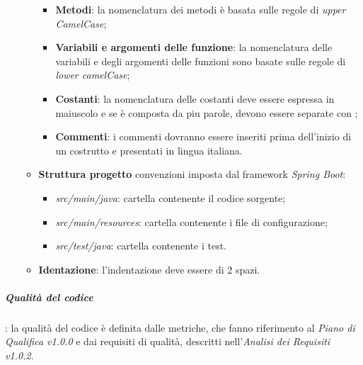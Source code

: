 \begin{itemize}
\begin{itemize}
\begin{itemize}
            \item \textbf{Metodi}: la nomenclatura dei metodi è basata sulle regole di \textit{upper CamelCase};
            \item \textbf{Variabili e argomenti delle funzione}: la nomenclatura delle variabili e degli argomenti delle funzioni sono basate sulle regole di \textit{lower camelCase};
            \item \textbf{Costanti}: la nomenclatura delle costanti deve essere espressa in maiuscolo e se è composta da piu parole, devono essere separate con \textit{\textunderscore};
            \item \textbf{Commenti}: i commenti dovranno essere inseriti prima dell’inizio di un  costrutto e presentati in lingua italiana.
        \end{itemize}
        \item \textbf{Struttura progetto} convenzioni imposta dal framework \textit{Spring Boot}:
        \begin{itemize}
            \item \textit{src/main/java}: cartella contenente il codice sorgente;
            \item \textit{src/main/resources}: cartella contenente i file di configurazione;
            \item \textit{src/test/java}: cartella contenente i test.
        \end{itemize}
        \item \textbf{Identazione}: l'indentazione deve essere di 2 spazi.
    \end{itemize}
\end{itemize}

\subparagraph{Qualità del codice}: la qualità del codice è definita dalle metriche, che fanno riferimento al \textit{Piano di Qualifica v1.0.0} e dai requisiti di qualità, descritti nell'\textit{Analisi dei Requisiti v1.0.2}. 

